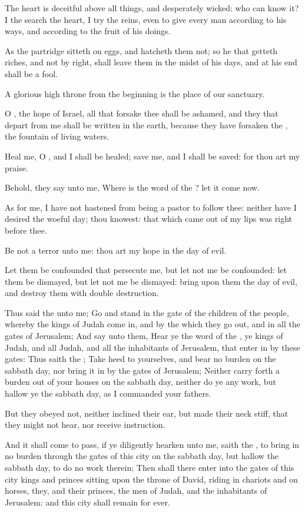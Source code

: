 \verse The heart is deceitful above all things, and desperately wicked: who can know it?  \verse I the \LORD search the heart, I try the reins, even to give every man according to his ways, and according to the fruit of his doings.

\verse As the partridge sitteth on eggs, and hatcheth them not; so he that getteth riches, and not by right, shall leave them in the midst of his days, and at his end shall be a fool.

\verse A glorious high throne from the beginning is the place of our sanctuary.

\verse O \LORD, the hope of Israel, all that forsake thee shall be ashamed, and they that depart from me shall be written in the earth, because they have forsaken the \LORD, the fountain of living waters.

\verse Heal me, O \LORD, and I shall be healed; save me, and I shall be saved: for thou art my praise.

\verse Behold, they say unto me, Where is the word of the \LORD? let it come now.

\verse As for me, I have not hastened from being a pastor to follow thee: neither have I desired the woeful day; thou knowest: that which came out of my lips was right before thee.

\verse Be not a terror unto me: thou art my hope in the day of evil.

\verse Let them be confounded that persecute me, but let not me be confounded: let them be dismayed, but let not me be dismayed: bring upon them the day of evil, and destroy them with double destruction.

\verse Thus said the \LORD unto me; Go and stand in the gate of the children of the people, whereby the kings of Judah come in, and by the which they go out, and in all the gates of Jerusalem; \verse And say unto them, Hear ye the word of the \LORD, ye kings of Judah, and all Judah, and all the inhabitants of Jerusalem, that enter in by these gates: \verse Thus saith the \LORD; Take heed to yourselves, and bear no burden on the sabbath day, nor bring it in by the gates of Jerusalem; \verse Neither carry forth a burden out of your houses on the sabbath day, neither do ye any work, but hallow ye the sabbath day, as I commanded your fathers.

\verse But they obeyed not, neither inclined their ear, but made their neck stiff, that they might not hear, nor receive instruction.

\verse And it shall come to pass, if ye diligently hearken unto me, saith the \LORD, to bring in no burden through the gates of this city on the sabbath day, but hallow the sabbath day, to do no work therein; \verse Then shall there enter into the gates of this city kings and princes sitting upon the throne of David, riding in chariots and on horses, they, and their princes, the men of Judah, and the inhabitants of Jerusalem: and this city shall remain for ever.

